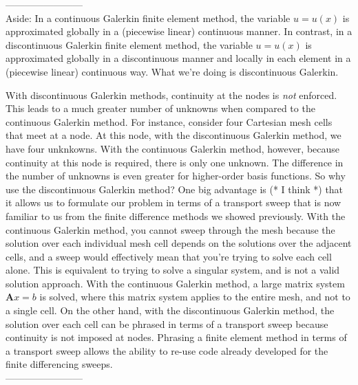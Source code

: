 \documentclass[12pt]{article}
\begin{document}
------------------------\\
Aside: In a continuous Galerkin finite element method, the variable $u =u(x)$ is approximated globally in a (piecewise linear) continuous manner. In contrast, in a discontinuous Galerkin finite element method, the variable $u =u(x)$ is approximated globally in a discontinuous manner and locally in each element in a (piecewise linear) continuous way. What we're doing is discontinuous Galerkin.

With discontinuous Galerkin methods, continuity at the nodes is \textit{not} enforced. This leads to a much greater number of unknowns when compared to the continuous Galerkin method. For instance, consider four Cartesian mesh cells that meet at a node. At this node, with the discontinuous Galerkin method, we have four unknkowns. With the continuous Galerkin method, however, because continuity at this node is required, there is only one unknown. The difference in the number of unknowns is even greater for higher-order basis functions. So why use the discontinuous Galerkin method? One big advantage is (* I think *) that it allows us to formulate our problem in terms of a transport sweep that is now familiar to us from the finite difference methods we showed previously. With the continuous Galerkin method, you cannot sweep through the mesh because the solution over each individual mesh cell depends on the solutions over the adjacent cells, and a sweep would effectively mean that you're trying to solve each cell alone. This is equivalent to trying to solve a singular system, and is not a valid solution approach. With the continuous Galerkin method, a large matrix system \(\textbf{A}x=b\) is solved, where this matrix system applies to the entire mesh, and not to a single cell. On the other hand, with the discontinuous Galerkin method, the solution over each cell can be phrased in terms of a transport sweep because continuity is not imposed at nodes. Phrasing a finite element method in terms of a transport sweep allows the ability to re-use code already developed for the finite differencing sweeps.\\
------------------------
\end{document}
